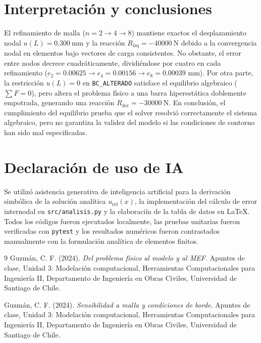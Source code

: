 \documentclass[11pt]{article}
\begin{document}
\section{Interpretación y conclusiones}
El refinamiento de malla ($n=2 \to 4 \to 8$) mantiene exactos el desplazamiento nodal $u(L) = \SI{0.300}{\mm}$ y la reacción $R_{\text{izq}} = \SI{-40000}{\N}$ debido a la convergencia nodal en elementos bajo vectores de carga consistentes. No obstante, el error entre nodos decrece cuadráticamente, dividiéndose por cuatro en cada refinamiento ($e_2 = 0.00625 \to e_4 = 0.00156 \to e_8 = 0.00039\text{ mm}$). Por otra parte, la restricción $u(L)=0$ en \texttt{BC\_ALTERADO} satisface el equilibrio algebraico ($\sum F = 0$), pero altera el problema físico a una barra hiperestática doblemente empotrada, generando una reacción $R_{\text{der}} = \SI{-30000}{\N}$. En conclusión, el cumplimiento del equilibrio prueba que el solver resolvió correctamente el sistema algebraico, pero no garantiza la validez del modelo si las condiciones de contorno han sido mal especificadas.

\section*{Declaración de uso de IA}
Se utilizó asistencia generativa de inteligencia artificial para la derivación simbólica de la solución analítica $u_{\text{ref}}(x)$, la implementación del cálculo de error internodal en \texttt{src/analisis.py} y la elaboraciín de la tabla de datos en LaTeX. Todos los códigos fueron ejecutados localmente, las pruebas unitarias fueron verificadas con \texttt{pytest} y los resultados numéricos fueron contrastados manualmente con la formulación analítica de elementos finitos.

\begin{thebibliography}{9}
Guzmán, C. F. (2024). \emph{Del problema físico al modelo y al MEF}. Apuntes de clase, Unidad 3: Modelación computacional, Herramientas Computacionales para Ingeniería II, Departamento de Ingeniería en Obras Civiles, Universidad de Santiago de Chile.

Guzmán, C. F. (2024). \emph{Sensibilidad a malla y condiciones de borde}. Apuntes de clase, Unidad 3: Modelación computacional, Herramientas Computacionales para Ingeniería II, Departamento de Ingeniería en Obras Civiles, Universidad de Santiago de Chile.

\end{thebibliography}
\end{document}
